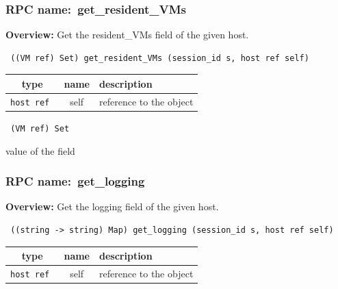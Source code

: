 \subsubsection{RPC name:~get\_resident\_VMs}

{\bf Overview:} 
Get the resident\_VMs field of the given host.

\begin{verbatim} ((VM ref) Set) get_resident_VMs (session_id s, host ref self)\end{verbatim}



 
\vspace{0.3cm}
\begin{tabular}{|c|c|p{7cm}|}
 \hline
{\bf type} & {\bf name} & {\bf description} \\ \hline
{\tt host ref } & self & reference to the object \\ \hline 

\end{tabular}

\vspace{0.3cm}

{\tt 
(VM ref) Set
}


value of the field
\vspace{0.3cm}
\vspace{0.3cm}
\vspace{0.3cm}
\subsubsection{RPC name:~get\_logging}

{\bf Overview:} 
Get the logging field of the given host.

\begin{verbatim} ((string -> string) Map) get_logging (session_id s, host ref self)\end{verbatim}



 
\vspace{0.3cm}
\begin{tabular}{|c|c|p{7cm}|}
 \hline
{\bf type} & {\bf name} & {\bf description} \\ \hline
{\tt host ref } & self & reference to the object \\ \hline 

\end{tabular}


